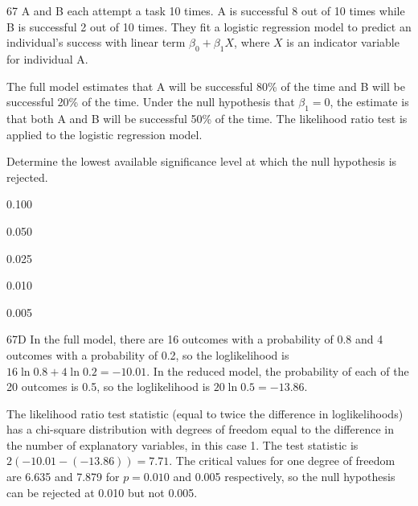 \begin{question}{67}
A and B each attempt a task 10 times. A is successful 8 out of 10 times while B is successful 2 out of 10 times. They fit a logistic regression model to predict an individual's success with linear term $\beta_0 + \beta_1 X$, where $X$ is an indicator variable for individual A.

The full model estimates that A will be successful 80\% of the time and B will be successful 20\% of the time. Under the null hypothesis that $\beta_1 = 0$, the estimate is that both A and B will be successful 50\% of the time. The likelihood ratio test is applied to the logistic regression model.

Determine the lowest available significance level at which the null hypothesis is rejected.

\begin{choices}
\item 0.100
\item 0.050
\item 0.025
\item 0.010
\item 0.005
\end{choices}
\end{question}
\begin{solution}{67}{D}
In the full model, there are 16 outcomes with a probability of 0.8 and 4 outcomes with a probability of 0.2, so the loglikelihood is $16 \ln 0.8 + 4 \ln 0.2 = -10.01$. In the reduced model, the probability of each of the 20 outcomes is 0.5, so the loglikelihood is $20 \ln 0.5 = -13.86$.

The likelihood ratio test statistic (equal to twice the difference in loglikelihoods) has a chi-square distribution with degrees of freedom equal to the difference in the number of explanatory variables, in this case 1. The test statistic is $2(-10.01 - (-13.86)) = 7.71$. The critical values for one degree of freedom are 6.635 and 7.879 for $p = 0.010$ and 0.005 respectively, so the null hypothesis can be rejected at 0.010 but not 0.005.
\end{solution}

